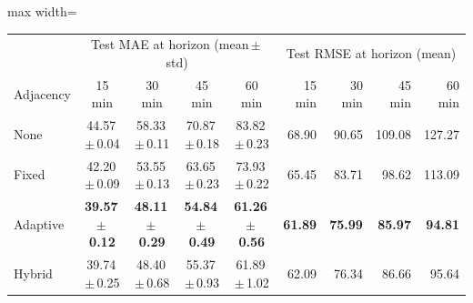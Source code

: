 \documentclass[11pt,a4paper]{article}
\newcommand{\sd}[2]{#1{\scriptsize\,$\scriptstyle\pm$\,#2}}
\begin{document}
\begin{table}[H]
\vspace{6pt}
\begin{adjustbox}{max width=\linewidth}
\begin{tabular}{lcccc@{\hspace{1.5em}}rrrr}
\toprule
 & \multicolumn{4}{c}{Test MAE at horizon (mean\,$\pm$\,std)} & \multicolumn{4}{c}{Test RMSE at horizon (mean)}\\
Adjacency & 15 min & 30 min & 45 min & 60 min & 15 min & 30 min & 45 min & 60 min\\
\midrule
None     & \sd{44.57}{0.04} & \sd{58.33}{0.11} & \sd{70.87}{0.18} & \sd{83.82}{0.23} & 68.90 & 90.65 & 109.08 & 127.27\\
Fixed    & \sd{42.20}{0.09} & \sd{53.55}{0.13} & \sd{63.65}{0.23} & \sd{73.93}{0.22} & 65.45 & 83.71 & 98.62  & 113.09\\
Adaptive & \textbf{\sd{39.57}{0.12}} & \textbf{\sd{48.11}{0.29}} & \textbf{\sd{54.84}{0.49}} & \textbf{\sd{61.26}{0.56}} & \textbf{61.89} & \textbf{75.99} & \textbf{85.97} & \textbf{94.81}\\
Hybrid   & \sd{39.74}{0.25} & \sd{48.40}{0.68} & \sd{55.37}{0.93} & \sd{61.89}{1.02} & 62.09 & 76.34 & 86.66 & 95.64\\
\bottomrule
\end{tabular}
\end{adjustbox}
\end{table}
\end{document}
